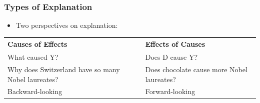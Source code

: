 \documentclass[xcolor=x11names,compress]{beamer}\usepackage[]{graphicx}\usepackage[]{color}
\renewcommand{\(}{\begin{columns}}
\renewcommand{\)}{\end{columns}}
\newcommand{\<}[1]{\begin{column}{#1}}
\renewcommand{\>}{\end{column}}
\begin{document}
\begin{frame}
\frametitle{Types of Explanation}
\begin{itemize}
\item Two perspectives on explanation:
\end{itemize}
\pause
\begin{table}[htbp]
  \centering
    \begin{tabular}{|>{\raggedright}p{5cm}|p{5cm}|}
    \toprule
    \textbf{Causes of Effects} & \textbf{Effects of Causes} \\
    \midrule
    What caused Y? & Does D cause Y? \\
    \midrule
    Why does Switzerland have so many Nobel laureates? & Does chocolate cause more Nobel laureates? \\
    \midrule
    Backward-looking & Forward-looking \\
    \bottomrule
    \end{tabular}%
  \label{tab:addlabel}%
\end{table}%
\end{frame}
\end{document}
